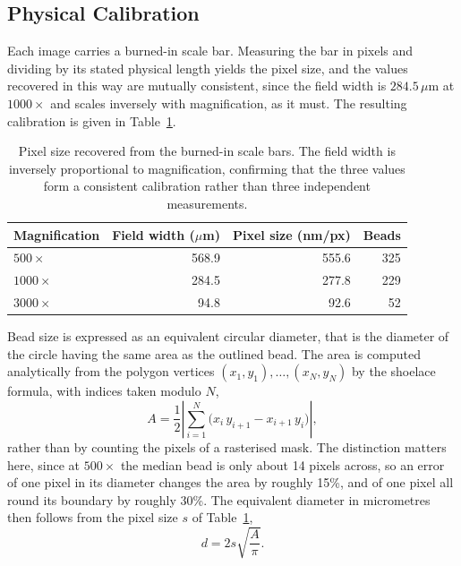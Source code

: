 \subsection{Physical Calibration}
\label{sec:calibration}

Each image carries a burned-in scale bar. Measuring the bar in pixels and
dividing by its stated physical length yields the pixel size, and the values
recovered in this way are mutually consistent, since the field width is
$284.5\,\mu$m at $1000\times$ and scales inversely with magnification, as it must.
The resulting calibration is given in Table~\ref{tab:calibration}.

\begin{table}[htbp]
    \centering
    \caption{Pixel size recovered from the burned-in scale bars. The field width is
    inversely proportional to magnification, confirming that the three values form a
    consistent calibration rather than three independent measurements.}
    \label{tab:calibration}
    \begin{tabular}{lrrr}
        \toprule
        Magnification & Field width ($\mu$m) & Pixel size (nm/px) & Beads \\
        \midrule
        $500\times$  & 568.9 & 555.6 & 325 \\
        $1000\times$ & 284.5 & 277.8 & 229 \\
        $3000\times$ & 94.8  & 92.6  & 52  \\
        \bottomrule
    \end{tabular}
\end{table}

Bead size is expressed as an equivalent circular diameter, that is the diameter of
the circle having the same area as the outlined bead. The area is computed
analytically from the polygon vertices $(x_1, y_1), \dots, (x_N, y_N)$ by the
shoelace formula, with indices taken modulo $N$,
%
\begin{equation}
    A = \frac{1}{2}
        \left| \sum_{i=1}^{N} \bigl( x_i \, y_{i+1} - x_{i+1} \, y_i \bigr) \right|,
    \label{eq:shoelace}
\end{equation}
%
rather than by counting the pixels of a rasterised mask. The distinction matters
here, since at $500\times$ the median bead is only about 14 pixels across, so an
error of one pixel in its diameter changes the area by roughly 15\%, and of one
pixel all round its boundary by roughly 30\%. The equivalent diameter in micrometres then follows from the pixel size $s$ of
Table~\ref{tab:calibration},
%
\begin{equation}
    d = 2 s \sqrt{\frac{A}{\pi}}.
    \label{eq:equivalent_diameter}
\end{equation}

